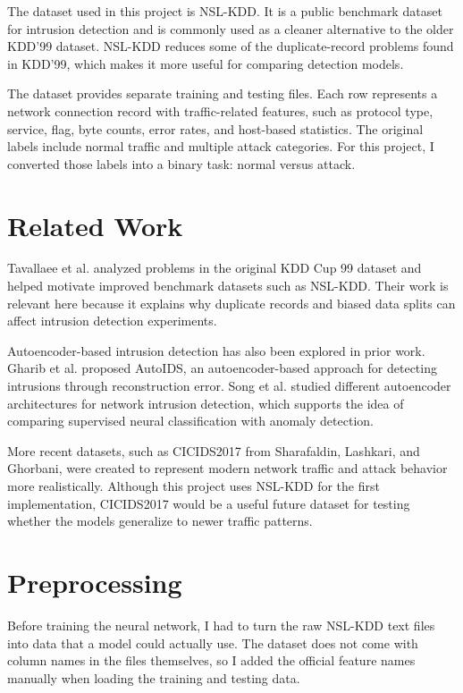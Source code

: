 \documentclass[11pt]{article}
\begin{document}
The dataset used in this project is NSL-KDD. It is a public benchmark dataset for intrusion detection and is commonly used as a cleaner alternative to the older KDD'99 dataset. NSL-KDD reduces some of the duplicate-record problems found in KDD'99, which makes it more useful for comparing detection models.

The dataset provides separate training and testing files. Each row represents a network connection record with traffic-related features, such as protocol type, service, flag, byte counts, error rates, and host-based statistics. The original labels include normal traffic and multiple attack categories. For this project, I converted those labels into a binary task: normal versus attack.

\section{Related Work}

Tavallaee et al. analyzed problems in the original KDD Cup 99 dataset and helped motivate improved benchmark datasets such as NSL-KDD. Their work is relevant here because it explains why duplicate records and biased data splits can affect intrusion detection experiments.

Autoencoder-based intrusion detection has also been explored in prior work. Gharib et al. proposed AutoIDS, an autoencoder-based approach for detecting intrusions through reconstruction error. Song et al. studied different autoencoder architectures for network intrusion detection, which supports the idea of comparing supervised neural classification with anomaly detection.

More recent datasets, such as CICIDS2017 from Sharafaldin, Lashkari, and Ghorbani, were created to represent modern network traffic and attack behavior more realistically. Although this project uses NSL-KDD for the first implementation, CICIDS2017 would be a useful future dataset for testing whether the models generalize to newer traffic patterns.

\section{Preprocessing}

Before training the neural network, I had to turn the raw NSL-KDD text files into data that a model could actually use. The dataset does not come with column names in the files themselves, so I added the official feature names manually when loading the training and testing data.
\end{document}
